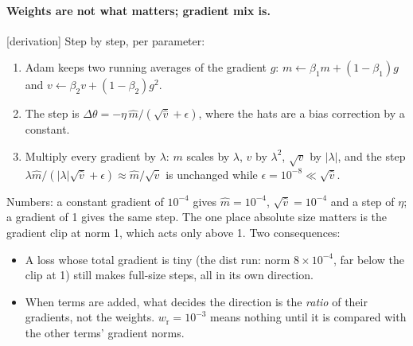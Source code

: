 \documentclass[11pt,a4paper]{article}
\newcommand{\status}[1]{\textsf{\small[#1]}}
\begin{document}
\paragraph{Weights are not what matters; gradient mix is.} \status{derivation} Step by step, per parameter:
\begin{enumerate}[nosep,leftmargin=1.4em]
\item Adam keeps two running averages of the gradient $g$: $m \leftarrow \beta_1 m + (1-\beta_1)g$ and
$v \leftarrow \beta_2 v + (1-\beta_2)g^2$.
\item The step is $\Delta\theta = -\eta\,\hat m/(\sqrt{\hat v}+\epsilon)$, where the hats are a bias correction by a
constant.
\item Multiply every gradient by $\lambda$: $m$ scales by $\lambda$, $v$ by $\lambda^2$, $\sqrt{v}$ by $|\lambda|$, and the
step $\lambda\hat m/(|\lambda|\sqrt{\hat v}+\epsilon)\approx\hat m/\sqrt{\hat v}$ is unchanged while $\epsilon = 10^{-8}\ll
\sqrt{\hat v}$.
\end{enumerate}
Numbers: a constant gradient of $10^{-4}$ gives $\hat m = 10^{-4}$, $\sqrt{\hat v} = 10^{-4}$ and a step of $\eta$; a
gradient of 1 gives the same step. The one place absolute size matters is the gradient clip at norm 1, which acts only
above 1. Two consequences:
\begin{itemize}[nosep]
\item A loss whose total gradient is tiny (the dist run: norm $8\times10^{-4}$, far below the clip at 1) still makes
full-size steps, all in its own direction.
\item When terms are added, what decides the direction is the \emph{ratio} of their gradients, not the weights.
$w_{\mathrm r} = 10^{-3}$ means nothing until it is compared with the other terms' gradient norms.
\end{itemize}
\end{document}
